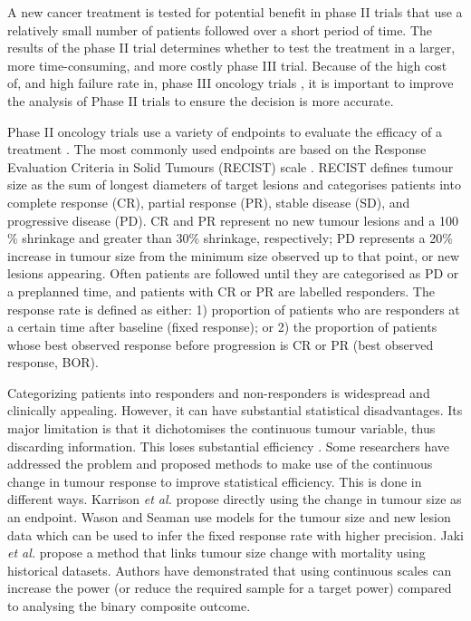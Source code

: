 \documentclass[10pt,A4]{article}
\begin{document}
A new cancer treatment is tested for potential benefit in phase II trials that use a relatively small number of patients followed over a short period of time. The results of the phase II trial determines whether to test the treatment in a larger, more time-consuming, and more costly phase III trial. Because of the high cost of, and high failure rate in, phase III oncology trials \cite{Paul2010}, it is important to improve the analysis of Phase II trials to ensure the decision is more accurate.

Phase II oncology trials use a variety of endpoints to evaluate the efficacy of a treatment \cite{Johnson2003,Pazdur2008}. The most commonly used endpoints are based on the Response Evaluation Criteria in Solid Tumours (RECIST) scale \cite{Eisenhauer2009}. RECIST defines tumour size as the sum of longest diameters of target lesions and categorises patients into complete response (CR), partial response (PR), stable disease (SD), and progressive disease (PD). CR and PR represent no new tumour lesions and a 100$\%$ shrinkage and greater than 30$\%$ shrinkage, respectively; PD represents a 20\% increase in tumour size from the minimum size observed up to that point, or new lesions appearing. Often patients are followed until they are categorised as PD or a preplanned time, and patients with CR or PR are labelled responders. The response rate is defined as either: 1) proportion of patients who are responders at a certain time after baseline (fixed response); or 2) the proportion of patients whose best observed response before progression is CR or PR (best observed response, BOR).

Categorizing patients into responders and non-responders is widespread and clinically appealing. However, it can have substantial statistical disadvantages. Its major limitation is that it dichotomises the continuous tumour variable, thus discarding information. This loses substantial efficiency \cite{Dhani2009}. Some researchers have addressed the problem and proposed methods to make use of the continuous change in tumour response to improve statistical efficiency. This is done in different ways. Karrison \textit{et al.} \cite{Karrison2007} propose directly using the change in tumour size as an endpoint. Wason and Seaman \cite{Wason2013} use models for the tumour size and new lesion data which can be used to infer the fixed response rate with higher precision. Jaki \textit{et al.} \cite{Jaki2013} propose a method that links tumour size change with mortality using historical datasets. Authors have demonstrated that using continuous scales can increase the power (or reduce the required sample for a target power) compared to analysing the binary composite outcome.
\end{document}
